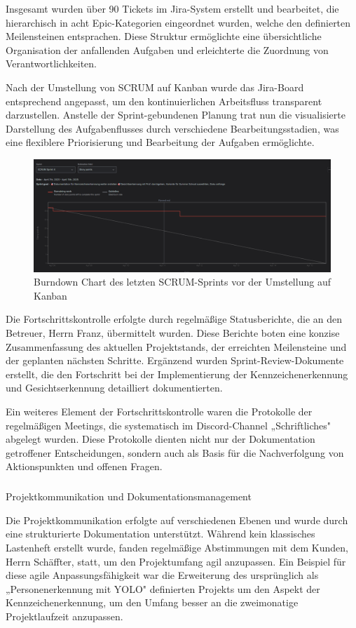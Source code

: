 Insgesamt wurden über 90 Tickets im Jira-System erstellt und bearbeitet, die hierarchisch in acht Epic-Kategorien eingeordnet wurden, welche den definierten Meilensteinen entsprachen. Diese Struktur ermöglichte eine übersichtliche Organisation der anfallenden Aufgaben und erleichterte die Zuordnung von Verantwortlichkeiten.

Nach der Umstellung von SCRUM auf Kanban wurde das Jira-Board entsprechend angepasst, um den kontinuierlichen Arbeitsfluss transparent darzustellen. Anstelle der Sprint-gebundenen Planung trat nun die visualisierte Darstellung des Aufgabenflusses durch verschiedene Bearbeitungsstadien, was eine flexiblere Priorisierung und Bearbeitung der Aufgaben ermöglichte.

\begin{figure}[h]
    \centering
    \includegraphics[width=1.0\textwidth]{data/burndown.png}
    \caption{Burndown Chart des letzten SCRUM-Sprints vor der Umstellung auf Kanban}
    \label{fig:burndown}
\end{figure}

Die Fortschrittskontrolle erfolgte durch regelmäßige Statusberichte, die an den Betreuer, Herrn Franz, übermittelt wurden. Diese Berichte boten eine konzise Zusammenfassung des aktuellen Projektstands, der erreichten Meilensteine und der geplanten nächsten Schritte. Ergänzend wurden Sprint-Review-Dokumente erstellt, die den Fortschritt bei der Implementierung der Kennzeichenerkennung und Gesichtserkennung detailliert dokumentierten.

Ein weiteres Element der Fortschrittskontrolle waren die Protokolle der regelmäßigen Meetings, die systematisch im Discord-Channel „Schriftliches" abgelegt wurden. Diese Protokolle dienten nicht nur der Dokumentation getroffener Entscheidungen, sondern auch als Basis für die Nachverfolgung von Aktionspunkten und offenen Fragen.

\subparagraph{}{Projektkommunikation und Dokumentationsmanagement}

Die Projektkommunikation erfolgte auf verschiedenen Ebenen und wurde durch eine strukturierte Dokumentation unterstützt. Während kein klassisches Lastenheft erstellt wurde, fanden regelmäßige Abstimmungen mit dem Kunden, Herrn Schäffter, statt, um den Projektumfang agil anzupassen. Ein Beispiel für diese agile Anpassungsfähigkeit war die Erweiterung des ursprünglich als „Personenerkennung mit YOLO" definierten Projekts um den Aspekt der Kennzeichenerkennung, um den Umfang besser an die zweimonatige Projektlaufzeit anzupassen.

